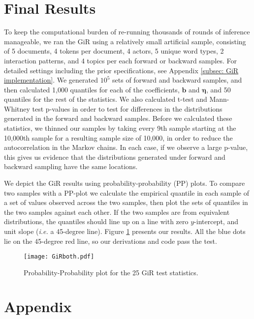 \documentclass[a4paper]{article}
\begin{document}
\section{Final Results}
To keep the computational burden of re-running thousands of rounds of inference manageable, we ran the GiR using a relatively small artificial sample, consisting of 5 documents, 4 tokens per document, 4 actors, 5 unique word types, 2 interaction patterns, and 4 topics per each forward or backward samples. For detailed settings including the prior specifications, see Appendix \ref{subsec: GiR implementation}.
We generated $10^5$ sets of forward and backward samples, and then calculated 1,000 quantiles for each of the coefficients, $\boldsymbol{b}$ and $\boldsymbol{\eta}$, and 50 quantiles for the rest of the statistics. We also calculated t-test and Mann-Whitney test p-values in order to test for differences in the distributions generated in the forward and backward samples. Before we calculated these statistics, we thinned our samples by taking every 9th sample starting at the 10,000th sample for a resulting sample size of 10,000, in order to reduce the autocorrelation in the Markov chains. In each case, if we observe a large p-value, this gives us evidence that the distributions generated under forward and backward sampling have the same locations. 

We depict the GiR results using probability-probability (PP) plots. To compare two samples with a PP-plot we calculate the empirical quantile in each sample of a set of values observed across the two samples, then plot the sets of quantiles in the two samples against each other. If the two samples are from equivalent distributions, the quantiles should line up on a line with zero $y$-intercept, and unit slope (\textit{i.e.} a 45-degree line). Figure \ref{fig:PPplot2} presents our results. All the blue dots lie on the
45-degree red line, so our derivations and code pass the test.
\begin{figure}[H]
	\centering
	\texttt{[image: GiRboth.pdf]} 
	\label{fig:PPplot2}
	\caption{Probability-Probability plot for the 25 GiR test statistics.}
\end{figure}


\appendix
 \section*{Appendix}
 \renewcommand{\thesubsection}{\Alph{subsection}}
\end{document}
